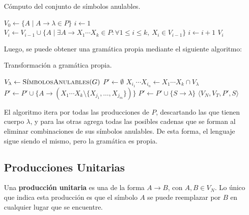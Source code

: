 \begin{algorithm}[H]
    \caption{Cómputo del conjunto de símbolos anulables.}
    \label{simbolos-anulables}
    \begin{algorithmic}[1]
        \State $V_0 \gets \{A \mid A \to \lambda \in P\}$
        \State $i \gets 1$
        \Repeat
        \State $V_i \gets V_{i - 1} \cup \{A \mid \exists A \to X_1 \cdots X_k \in P : \forall 1 \leq i \leq k, \ X_i \in V_{i - 1} \}$
        \State $i \gets i + 1$
        \State \Return $V_i$
        \EndProcedure
    \end{algorithmic}
\end{algorithm}

Luego, se puede obtener una gramática propia mediante el siguiente algoritmo:
\begin{algorithm}[H]
    \caption{Transformación a gramática propia.}
    \label{gramatica-propia}
    \begin{algorithmic}[1]
        \State $V_\lambda \gets \textsc{SímbolosAnulables}(G)$
        \State $P' \gets \emptyset$
            \State $X_{i_1} \cdots X_{i_n} \gets X_1 \cdots X_k \cap V_\lambda$  
            \State $P' \gets P' \cup \{A \to (X_1 \cdots X_k \setminus \{X_{j_1}, \dots, X_{j_m}\})\}$
            \EndFor
        \EndFor
            \State $P' \gets P' \cup \{S \to \lambda\}$
        \EndIf
        \State \Return $\langle V_N, V_T, P', S \rangle$
        \EndProcedure
    \end{algorithmic}
\end{algorithm}

El algoritmo itera por todas las producciones de $P$, descartando las que tienen cuerpo $\lambda$, y para las otras agrega todas las posibles cadenas que se forman al eliminar combinaciones de sus símbolos anulables. De esta forma, el lenguaje sigue siendo el mismo, pero la gramática es propia.

\subsection{Producciones Unitarias}

Una \textbf{producción unitaria} es una de la forma $A \to B$, con $A, B \in V_N$. Lo único que indica esta producción es que el símbolo $A$ se puede reemplazar por $B$ en cualquier lugar que se encuentre.

